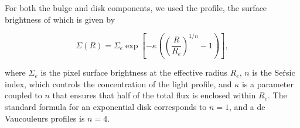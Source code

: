 For both the bulge and disk components, we used the \sersic{} profile, the surface brightness of which is given by  

\begin{equation}
\Sigma(R) = \Sigma_e \exp \left[ -\kappa \left( \left( \frac{R}{R_e}\right)^{1/n} - 1 \right) \right] ,
\label{eq_c2:sersic_fn}
\end{equation}

\noindent
where $\Sigma_e$ is the pixel surface brightness at the effective radius $R_e$, $n$ is the Se\'rsic index, which controls the concentration of the light profile, and $\kappa$ is a parameter coupled to $n$ that ensures that half of the total flux is enclosed within $R_e$.
The standard formula for an exponential disk corresponds to $n=1$, and a de\,Vaucouleurs profiles is $n=4$.


